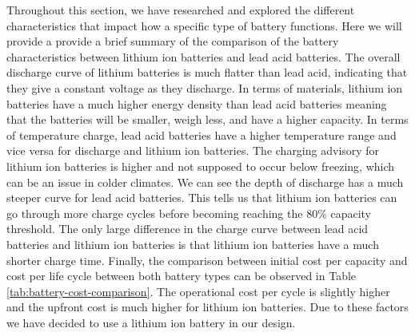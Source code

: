 Throughout this section, we have researched and explored the different characteristics that impact how a specific type of battery functions. Here we will provide a provide a brief summary of the comparison of the battery characteristics between lithium ion batteries and lead acid batteries. The overall discharge curve of lithium batteries is much flatter than lead acid, indicating that they give a constant voltage as they discharge. In terms of materials, lithium ion batteries have a much higher energy density than lead acid batteries meaning that the batteries will be smaller, weigh less, and have a higher capacity. In terms of temperature charge, lead acid batteries have a higher temperature range and vice versa for discharge and lithium ion batteries. The charging advisory for lithium ion batteries is higher and not supposed to occur below freezing, which can be an issue in colder climates. We can see the depth of discharge has a much steeper curve for lead acid batteries. This tells us that lithium ion batteries can go through more charge cycles before becoming reaching the 80\% capacity threshold. The only large difference in the charge curve between lead acid batteries and lithium ion batteries is that lithium ion batteries have a much shorter charge time. Finally, the comparison between initial cost per capacity and cost per life cycle between both battery types can be observed in Table \ref{tab:battery-cost-comparison}. The operational cost per cycle is slightly higher and the upfront cost is much higher for lithium ion batteries. Due to these factors we have decided to use a lithium ion battery in our design.

